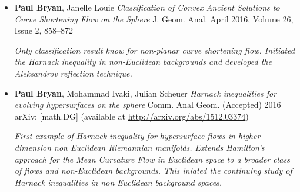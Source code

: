 \documentclass[12pt]{article}
\begin{document}
\begin{itemize}
\item \textbf{Paul Bryan}, Janelle Louie \emph{Classification of Convex Ancient Solutions to Curve Shortening Flow on the Sphere} J. Geom. Anal. April 2016, Volume 26, Issue 2, 858--872

\emph{Only classification result know for non-planar curve shortening flow. Initiated the Harnack inequality in non-Euclidean backgrounds and developed the Aleksandrov reflection technique.}

\item \textbf{Paul Bryan}, Mohammad Ivaki, Julian Scheuer \emph{Harnack inequalities for evolving hypersurfaces on the sphere} Comm. Anal Geom. (Accepted) 2016 arXiv: [math.DG] (available at \url{http://arxiv.org/abs/1512.03374})

\emph{First example of Harnack inequality for hypersurface flows in higher dimension non Euclidean Riemannian manifolds. Extends Hamilton's approach for the Mean Curvature Flow in Euclidean space to a broader class of flows and non-Euclidean backgrounds. This iniated the continuing study of Harnack inequalities in non Euclidean background spaces.}
\end{itemize}
\end{document}
